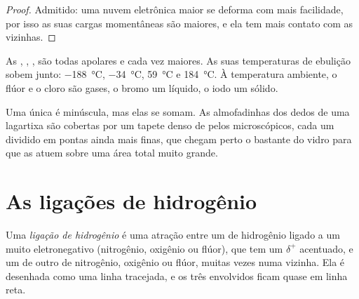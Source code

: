 \begin{proof}
Admitido: uma nuvem eletrônica maior se deforma com mais facilidade, por
isso as suas cargas momentâneas são maiores, e ela tem mais contato com
as vizinhas.
\end{proof}

\begin{example}[Os halogênios]\label{ex:g11:polarity-and-cohesion:halogens}
As  , , ,  são todas apolares e
cada vez maiores. As suas temperaturas de ebulição sobem junto:
\qty{-188}{\celsius}, \qty{-34}{\celsius}, \qty{59}{\celsius} e
\qty{184}{\celsius}. À temperatura ambiente, o flúor e o cloro são
gases, o bromo um líquido, o iodo um sólido.
\end{example}

\begin{remark}[A lagartixa]\label{rem:g11:polarity-and-cohesion:gecko}
Uma única  é minúscula, mas elas se somam. As
almofadinhas dos dedos de uma lagartixa são cobertas por um tapete denso
de pelos microscópicos, cada um dividido em pontas ainda mais finas, que
chegam perto o bastante do vidro para que as 
atuem sobre uma área total muito grande.
\end{remark}

\section{As ligações de hidrogênio}

\begin{definition}\label{def:g11:polarity-and-cohesion:hydrogen-bond}
Uma \emph{ligação de hidrogênio} é uma
atração entre um  de hidrogênio ligado a um  muito
eletronegativo (nitrogênio, oxigênio ou flúor), que tem um $\delta^+$
acentuado, e um  de outro  de nitrogênio, oxigênio
ou flúor, muitas vezes numa  vizinha. Ela é desenhada como uma
linha tracejada, e os três  envolvidos ficam quase em linha reta.
\end{definition}

